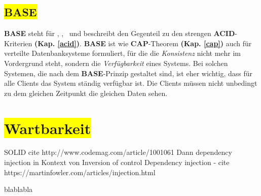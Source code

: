 %



\subsection{\colorbox{yellow}{BASE}}\label{base}

\textbf{BASE} steht für \BAse, \baSe, \basE\ und beschreibt den Gegenteil zu den strengen \textbf{ACID}-Kriterien \textbf{(Kap. \ref{acid})}. \textbf{BASE} ist wie \textbf{CAP}-Theorem \textbf{(Kap. \ref{cap})} auch für verteilte Datenbanksysteme formuliert, für die die \textit{Konsistenz} nicht mehr im Vordergrund steht, sondern die \textit{Verfügbarkeit} eines Systems. Bei solchen Systemen, die nach dem \textbf{BASE}-Prinzip gestaltet sind, ist eher wichtig, dass für alle Clients das System ständig verfügbar ist. Die Clients müssen nicht unbedingt zu dem gleichen Zeitpunkt die gleichen Daten sehen.


\section{\colorbox{yellow}{Wartbarkeit}}\label{maintenance}

 SOLID  cite http://www.codemag.com/article/1001061
     Dann dependency injection in Kontext von Inversion of control
     Dependency injection - cite https://martinfowler.com/articles/injection.html

blablabla

